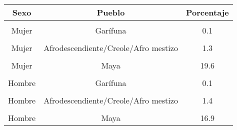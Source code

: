 \begin{tabular}[t]{ccc}
\toprule
\textbf{Sexo} & \textbf{Pueblo} & \textbf{Porcentaje}\\
\midrule
\cellcolor[HTML]{B6B3FF}{Mujer} & \cellcolor[HTML]{B6B3FF}{Xinka} & \cellcolor[HTML]{B6B3FF}{0.7}\\
Mujer & Garífuna & 0.1\\
\cellcolor[HTML]{B6B3FF}{Mujer} & \cellcolor[HTML]{B6B3FF}{Ladino} & \cellcolor[HTML]{B6B3FF}{31.2}\\
Mujer & Afrodescendiente/Creole/Afro mestizo & 1.3\\
\cellcolor[HTML]{B6B3FF}{Mujer} & \cellcolor[HTML]{B6B3FF}{Extranjero} & \cellcolor[HTML]{B6B3FF}{0.1}\\
Mujer & Maya & 19.6\\
\cellcolor[HTML]{B6B3FF}{Hombre} & \cellcolor[HTML]{B6B3FF}{Xinka} & \cellcolor[HTML]{B6B3FF}{0.6}\\
Hombre & Garífuna & 0.1\\
\cellcolor[HTML]{B6B3FF}{Hombre} & \cellcolor[HTML]{B6B3FF}{Ladino} & \cellcolor[HTML]{B6B3FF}{27.8}\\
Hombre & Afrodescendiente/Creole/Afro mestizo & 1.4\\
\cellcolor[HTML]{B6B3FF}{Hombre} & \cellcolor[HTML]{B6B3FF}{Extranjero} & \cellcolor[HTML]{B6B3FF}{0.2}\\
Hombre & Maya & 16.9\\
\bottomrule
\end{tabular}
